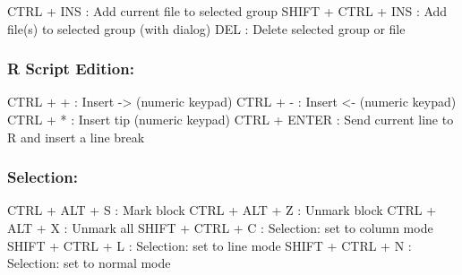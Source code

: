 \vspace{-0.5cm}
\begin{Rtables}[caption={[Project keyboard shortcuts]
    Project keyboard shortcuts},
  label=hotkey:project]
  CTRL  + INS             : Add current file to selected group
  SHIFT + CTRL + INS      : Add file(s) to selected group (with dialog)
  DEL                     : Delete selected group or file
\end{Rtables}


\subsubsection{R Script Edition:}

\vspace{-0.5cm}
\begin{Rtables}[caption={[R script edition keyboard shortcuts]
    R script edition keyboard shortcuts},
  label=hotkey:rscript]
  CTRL + +                : Insert ->  (numeric keypad)
  CTRL + -                : Insert <-  (numeric keypad)
  CTRL + *                : Insert tip (numeric keypad)
  CTRL + ENTER            : Send current line to R and insert a line break
\end{Rtables}


\subsubsection{Selection:}

\vspace{-0.5cm}
\begin{Rtables}[caption={[Selection keyboard shortcuts]
    Selection keyboard shortcuts},
  label=hotkey:selection]
  CTRL  + ALT  + S        : Mark block
  CTRL  + ALT  + Z        : Unmark block
  CTRL  + ALT  + X        : Unmark all
  SHIFT + CTRL + C        : Selection: set to column mode
  SHIFT + CTRL + L        : Selection: set to line mode
  SHIFT + CTRL + N        : Selection: set to normal mode
\end{Rtables}


